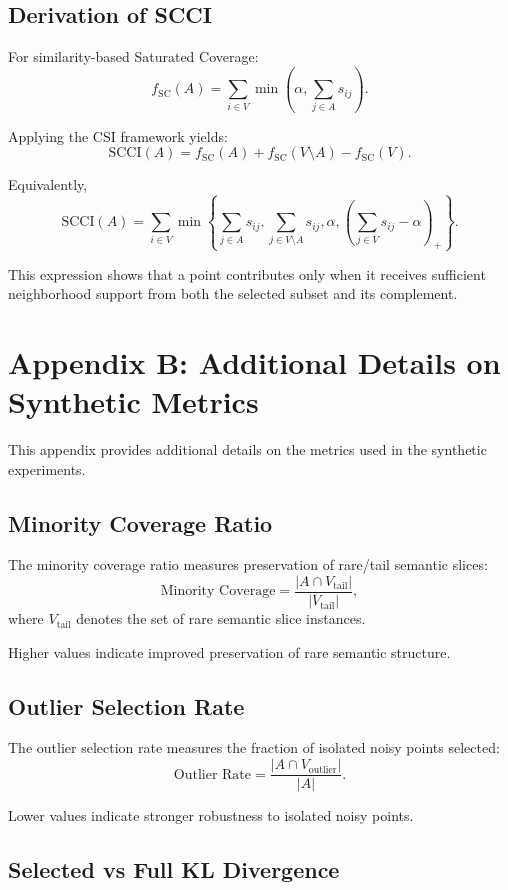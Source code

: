 \documentclass[11pt]{article}
\begin{document}
\subsection{Derivation of SCCI}

For similarity-based Saturated Coverage:
\[
f_{\text{SC}}(A)
=
\sum_{i\in V}
\min\left(
\alpha,\sum_{j\in A}s_{ij}
\right).
\]

Applying the CSI framework yields:
\[
\text{SCCI}(A)
=
f_{\text{SC}}(A)
+
f_{\text{SC}}(V\setminus A)
-
f_{\text{SC}}(V).
\]

Equivalently,
\[
\text{SCCI}(A)
=
\sum_{i\in V}
\min\left\{
\sum_{j\in A}s_{ij},
\sum_{j\in V\setminus A}s_{ij},
\alpha,
\left(
\sum_{j\in V}s_{ij}-\alpha
\right)_+
\right\}.
\]

This expression shows that a point contributes only when it receives sufficient neighborhood support from both the selected subset and its complement.

\section{Appendix B: Additional Details on Synthetic Metrics}
\label{appendix:metrics}

This appendix provides additional details on the metrics used in the synthetic experiments.

\subsection{Minority Coverage Ratio}

The minority coverage ratio measures preservation of rare/tail semantic slices:
\[
\text{Minority Coverage}
=
\frac{
|A \cap V_{\text{tail}}|
}{
|V_{\text{tail}}|
},
\]
where $V_{\text{tail}}$ denotes the set of rare semantic slice instances.

Higher values indicate improved preservation of rare semantic structure.

\subsection{Outlier Selection Rate}

The outlier selection rate measures the fraction of isolated noisy points selected:
\[
\text{Outlier Rate}
=
\frac{
|A \cap V_{\text{outlier}}|
}{
|A|
}.
\]

Lower values indicate stronger robustness to isolated noisy points.

\subsection{Selected vs Full KL Divergence}
\end{document}

